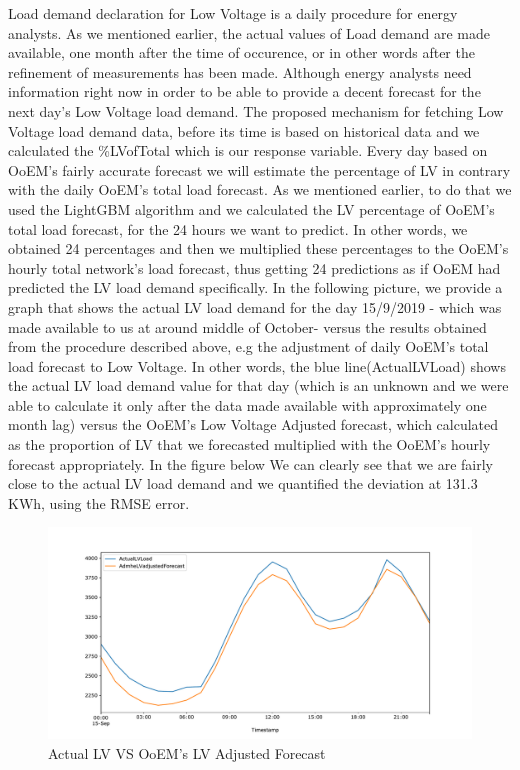 \par Load demand declaration for Low Voltage is a daily procedure for energy analysts. As we mentioned earlier, the actual values of Load demand are made available, one month after the time of occurence, or in other words after the refinement of measurements has been made. Although energy analysts need information right now in order to be able to provide a decent forecast for the next day's Low Voltage load demand. The proposed mechanism for fetching Low Voltage load demand data, before its time is based on historical data and we calculated the \%LVofTotal which is our response variable. Every day based on OoEM's fairly accurate forecast we will estimate the percentage of LV in contrary with the daily OoEM's total load forecast. As we mentioned earlier, to do that we used the LightGBM algorithm and we calculated the LV percentage of OoEM's total load forecast,  for the 24 hours we want to predict. In other words, we obtained 24 percentages and then we multiplied these percentages to the OoEM's hourly total network's load forecast, thus getting 24 predictions as if OoEM had predicted the LV load demand specifically. In the following picture, we provide a graph that shows the actual LV load demand for the day 15/9/2019 - which was made available to us at around middle of October- versus the results obtained from the procedure described above, e.g the adjustment of daily OoEM's total load forecast to Low Voltage. In other words, the blue line(ActualLVLoad) shows the actual LV load demand value for that day (which is an unknown and we were able to calculate it only after the data made available with approximately one month lag) versus the OoEM's Low Voltage Adjusted forecast, which calculated as the proportion of LV that we forecasted multiplied with the OoEM's hourly forecast appropriately. In the figure below We can clearly see that we are fairly close to the actual LV load demand and we quantified the deviation at 131.3 KWh, using the RMSE error.
\begin{figure}[h!]
\centering
\includegraphics[width=1\linewidth]{project/loadadjustment.pdf}
\caption{ Actual LV VS OoEM's LV Adjusted Forecast}
\label{fig:felix}
\end{figure}
